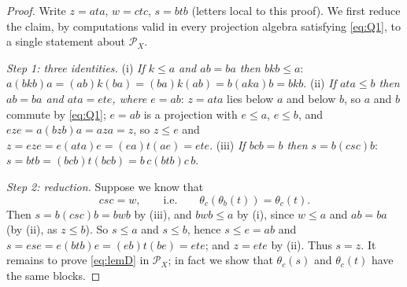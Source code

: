 \documentclass[11pt]{amsart}
\theoremstyle{definition}
\renewcommand{\P}{\mathcal{P}}      %
\begin{document}
\begin{proof}
Write $z=ata$, $w=ctc$, $s=btb$ (letters local to this proof). We first reduce the claim, by computations valid in every projection algebra satisfying \eqref{eq:Q1}, to a single statement about $\P_X$.

\smallskip
\emph{Step 1: three identities.} (i) \emph{If $k\le a$ and $ab=ba$ then $bkb\le a$}: $a(bkb)a=(ab)k(ba)=(ba)k(ab)=b(aka)b=bkb$. (ii) \emph{If $ata\le b$ then $ab=ba$ and $ata=ete$, where $e=ab$}: $z=ata$ lies below $a$ and below $b$, so $a$ and $b$ commute by \eqref{eq:Q1}; $e=ab$ is a projection with $e\le a$, $e\le b$, and $eze=a(bzb)a=aza=z$, so $z\le e$ and $z=eze=e(ata)e=(ea)t(ae)=ete$. (iii) \emph{If $bcb=b$ then $s=b(csc)b$}: $s=btb=(bcb)t(bcb)=b\,c(btb)c\,b$.

\emph{Step 2: reduction.} Suppose we know that
\begin{equation}\label{eq:lemD}
csc=w,\qquad\text{i.e.}\qquad \theta_c(\theta_b(t))=\theta_c(t) .
\end{equation}
Then $s=b(csc)b=bwb$ by (iii), and $bwb\le a$ by (i), since $w\le a$ and $ab=ba$ (by (ii), as $z\le b$). So $s\le a$ and $s\le b$, hence $s\le e=ab$ and $s=ese=e(btb)e=(eb)t(be)=ete$; and $z=ete$ by (ii). Thus $s=z$. It remains to prove \eqref{eq:lemD} in $\P_X$; in fact we show that $\theta_c(s)$ and $\theta_c(t)$ have the same blocks.


\end{proof}
\end{document}
